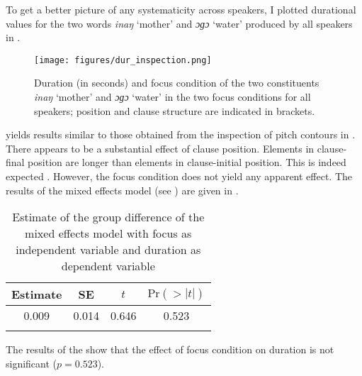 To get a better picture of any systematicity across speakers, I plotted durational values for the two words \textit{inaŋ} `mother' and \textit{ɔɡɔ} `water'  produced by all speakers in  .  



\begin{figure}
	\texttt{[image: figures/dur\_inspection.png]}
	\caption{Duration (in seconds) and focus condition of the two constituents \textit{inaŋ} `mother' and \textit{ɔɡɔ} `water' in the two focus conditions  for all speakers; position and clause structure are indicated in brackets.}
	\label{dur inspection_all}
\end{figure}

 yields results similar to those obtained from the inspection of pitch contours in   .
There appears to be a substantial effect of clause position. Elements in clause-final position are longer than elements in clause-initial position. This is indeed expected  \citep[cf. utterance-final lengthening\slash preboundary lengthening;][]{turk2020speech, byrd2006far, berkovits1993utterance}. However, the focus condition does not yield any apparent effect. The results of the mixed effects model (see ) are given in  	.

\begin{table}
	\caption{Estimate of the group difference of the mixed effects model with focus as independent variable and duration as dependent variable}
	\label{lmer_dur}
	\begin{tabular}{cccc}
		\lsptoprule
		{Estimate}   & {SE} & {$t$}  & $\text{Pr}(>|t|)$ \\
		\midrule
		0.009 & 0.014 & 0.646 & 0.523      \\
		\lspbottomrule     
	\end{tabular}
\end{table}

The results of the show that the effect of focus condition on duration is not significant ($p=0.523$). 






